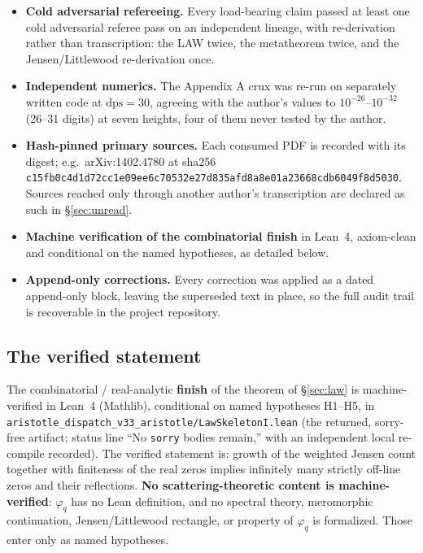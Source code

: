 \documentclass[11pt]{amsart}
\theoremstyle{remark}
\begin{document}
\begin{itemize}
\item \textbf{Cold adversarial refereeing.} Every load-bearing claim
passed at least one cold adversarial referee pass on an independent
lineage, with re-derivation rather than transcription: the LAW twice,
the metatheorem twice, and the Jensen/Littlewood re-derivation once.
\item \textbf{Independent numerics.} The Appendix A crux was re-run on
separately written code at $\mathrm{dps}=30$, agreeing with the
author's values to $10^{-26}$--$10^{-32}$ (26--31 digits) at seven
heights, four of them never tested by the author.
\item \textbf{Hash-pinned primary sources.} Each consumed PDF is
recorded with its digest; e.g.\ arXiv:1402.4780 at sha256
\texttt{c15fb0c4d1d72cc1e09ee6c70532e27d835afd8a8e01a23668cdb6049f8d5030}.
Sources reached only through another author's transcription are
declared as such in \S\ref{sec:unread}.
\item \textbf{Machine verification of the combinatorial finish} in
Lean~4, axiom-clean and conditional on the named hypotheses, as detailed
below.
\item \textbf{Append-only corrections.} Every correction was applied as
a dated append-only block, leaving the superseded text in place, so the
full audit trail is recoverable in the project repository.
\end{itemize}

\subsection{The verified statement}

The combinatorial / real-analytic \textbf{finish} of the theorem of
\S\ref{sec:law} is machine-verified in Lean~4 (Mathlib), conditional on
named hypotheses H1--H5, in
\texttt{aristotle\_dispatch\_v33\_aristotle/LawSkeletonI.lean} (the
returned, sorry-free artifact; status line ``No \texttt{sorry} bodies
remain,'' with an independent local re-compile recorded). The verified
statement is: growth of the weighted Jensen count together with
finiteness of the real zeros implies infinitely many strictly off-line
zeros and their reflections. \textbf{No scattering-theoretic content is
machine-verified}: $\varphi_q$ has no Lean definition, and no spectral
theory, meromorphic continuation, Jensen/Littlewood rectangle, or
property of $\varphi_q$ is formalized. Those enter only as named
hypotheses.
\end{document}
